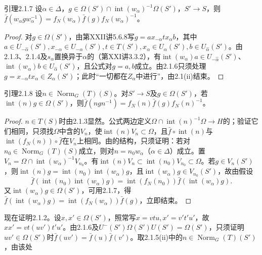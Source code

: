 \begin{SGAresult}{引理}{2.1.7}
设$\alpha\in\Delta$，$g\in\Omega(S')\cap\operatorname{int}(w_\alpha)^{-1}\Omega(S')$，$S'\to S$，则$\bar f(w_\alpha gw_\alpha^{-1})=f_N(w_\alpha)\bar f(g)f_N(w_\alpha)^{-1}$。
\end{SGAresult}
\begin{proof}
对$g\in\Omega(S')$，由第XXII讲5.6.8写$g=ax_{-\alpha}tx_\alpha b$，其中$a\in U_{-\widehat\alpha}(S'),x_{-\alpha}\in U_{-\alpha}(S'),t\in T(S'),x_\alpha\in U_\alpha(S'),b\in U_{\widehat\alpha}(S')$。由2.1.3、2.1.4及$s_\alpha$置换异于$\alpha$的（第XXI讲3.3.2），有$\operatorname{int}(w_\alpha)a\in U_{-\widehat\alpha}(S')$、$\operatorname{int}(w_\alpha)b\in U_{\widehat\alpha}(S')$，且公式对$g=a,b$成立。由2.1.6只须处理$g=x_{-\alpha}tx_\alpha\in Z_\alpha(S')$；此时“一切都在$Z_\alpha$中进行”，由2.1(ii)结束。
\end{proof}
\begin{SGAresult}{引理}{2.1.8}
设$n\in\operatorname{Norm}_G(T)(S)$。对$S'\to S$及$g\in\Omega(S')$，若$\operatorname{int}(n)g\in\Omega(S')$，则$\bar f(ngn^{-1})=f_N(n)\bar f(g)f_N(n)^{-1}$。
\end{SGAresult}
\begin{proof}
$n\in T(S)$时由2.1.3显然。公式两边定义$\Omega\cap\operatorname{int}(n)^{-1}\Omega\to H$的；验证它们相同，只须找$\Omega$中含的$V_n$，使$\operatorname{int}(n)V_n\subset\Omega$，且$\bar f\circ\operatorname{int}(n)$与$\operatorname{int}(f_N(n))\circ\bar f$在$V_n$上相同。由的结构，只须证明：若对$n_0\in\operatorname{Norm}_G(T)(S)$成立，则对$n=n_0w_\alpha$（$\alpha\in\Delta$）成立。置$V_n=\Omega\cap\operatorname{int}(w_\alpha)^{-1}V_{n_0}$。有$\operatorname{int}(n)V_n\subset\operatorname{int}(n_0)V_{n_0}\subset\Omega$。若$g\in V_n(S')$，则$\operatorname{int}(n)g=\operatorname{int}(n_0)\operatorname{int}(w_\alpha)g$，且$\operatorname{int}(w_\alpha)g\in V_{n_0}(S')$，故由假设
\[\bar f(\operatorname{int}(n_0)\operatorname{int}(w_\alpha)g)=\operatorname{int}(f_N(n_0))\bar f(\operatorname{int}(w_\alpha)g).\]
又$\operatorname{int}(w_\alpha)g\in\Omega(S')$，可用2.1.7，得$\bar f(\operatorname{int}(w_\alpha)g)=\operatorname{int}(f_N(w_\alpha))\bar f(g)$，立即结束。
\end{proof}
现在证明2.1.2。设$x,x'\in\Omega(S')$，照常写$x=vtu,x'=v't'u'$，故$xx'=vt(uv')t'u'$。由2.1.6及$U^-(S')\Omega(S')U(S')=\Omega(S')$，只须证明$uv'\in\Omega(S')$时$\bar f(uv')=\bar f(u)\bar f(v')$。取2.1.5(ii)中的$n\in\operatorname{Norm}_G(T)(S')$，由该处
